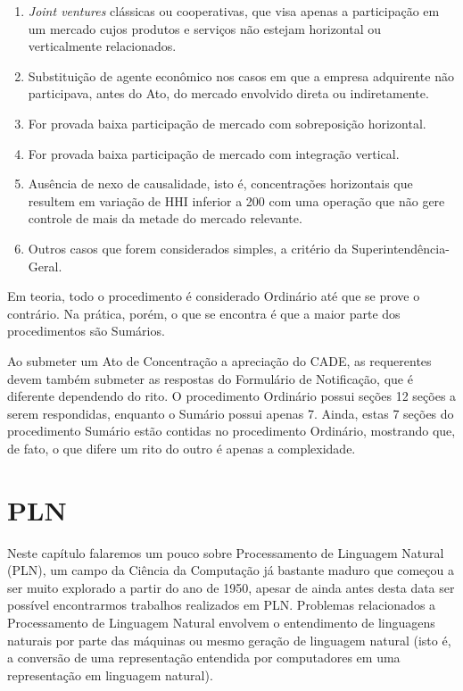 \documentclass[11pt]{report}
\begin{document}
\begin{enumerate}[label=\textbf{\Roman*.}]
\item \textit{Joint ventures} clássicas ou cooperativas, que visa apenas a participação em um mercado cujos produtos e serviços não
estejam horizontal ou verticalmente relacionados.
\item Substituição de agente econômico nos casos em que a empresa adquirente não participava, antes do Ato, do mercado envolvido direta ou indiretamente.
\item For provada baixa participação de mercado com sobreposição horizontal.
\item For provada baixa participação de mercado com integração vertical.
\item Ausência de nexo de causalidade, isto é, concentrações horizontais que resultem em variação de HHI inferior a 200 com uma operação que não gere controle de mais da
metade do mercado relevante.
\item Outros casos que forem considerados simples, a critério da Superintendência-Geral.
\end{enumerate}

Em teoria, todo o procedimento é considerado Ordinário até que se prove o contrário. Na prática, porém, o que se encontra é que a maior parte dos procedimentos são Sumários.

Ao submeter um Ato de Concentração a apreciação do CADE, as requerentes devem também submeter as respostas do Formulário de Notificação, que é diferente dependendo do rito.
O procedimento Ordinário possui seções 12 seções a serem respondidas, enquanto o Sumário possui apenas 7. Ainda, estas 7 seções do procedimento Sumário estão contidas no
procedimento Ordinário, mostrando que, de fato, o que difere um rito do outro é apenas a complexidade.

\pagebreak
\chapter{PLN}

\indent\indent Neste capítulo falaremos um pouco sobre Processamento de Linguagem Natural (PLN), um campo da Ciência da Computação já bastante maduro que começou a ser muito
explorado a partir do ano de 1950, apesar de ainda antes desta data ser possível encontrarmos trabalhos realizados em PLN. Problemas relacionados a
Processamento de Linguagem Natural envolvem o entendimento de linguagens naturais por parte das máquinas ou mesmo geração de linguagem natural (isto é, a conversão
de uma representação entendida por computadores em uma representação em linguagem natural).
\end{document}
